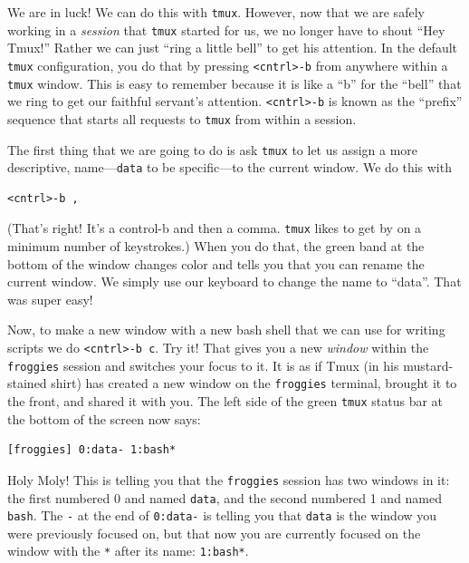 \documentclass[]{krantz}
\begin{document}
We are in luck! We can do this with \texttt{tmux}. However, now that we are safely working in a \emph{session}
that \texttt{tmux} started for us, we no longer have to shout ``Hey Tmux!'' Rather we can just ``ring a little
bell'' to get his attention. In the default \texttt{tmux} configuration, you do that by pressing
\texttt{\textless{}cntrl\textgreater{}-b} from anywhere within a \texttt{tmux} window. This is easy to remember because it is like
a ``b'' for the ``bell'' that we ring to get our faithful servant's attention. \texttt{\textless{}cntrl\textgreater{}-b} is known
as the ``prefix'' sequence that starts all requests to \texttt{tmux} from within a session.

The first thing that we are going to do is ask \texttt{tmux} to let us assign a more descriptive,
name---\texttt{data} to be specific---to the current window. We do this with

\begin{verbatim}
<cntrl>-b ,
\end{verbatim}

(That's right! It's a control-b and then a comma. \texttt{tmux} likes to get by on a minimum number
of keystrokes.) When you do that, the green band at the bottom of the window changes color
and tells you that you can rename the current window. We simply use our keyboard to
change the name to ``data''. That was super easy!

Now, to make a new window with a new bash shell that we can use for writing scripts
we do \texttt{\textless{}cntrl\textgreater{}-b\ c}. Try it! That gives you a new \emph{window} within the \texttt{froggies} session
and switches your focus to it. It is as if Tmux (in his mustard-stained shirt) has created
a new window on the \texttt{froggies} terminal, brought it to the front, and shared it with you.
The left side of the green \texttt{tmux} status bar at the bottom of the screen now says:

\begin{verbatim}
[froggies] 0:data- 1:bash*
\end{verbatim}

Holy Moly! This is telling you that the \texttt{froggies} session has two windows in it: the first
numbered 0 and named \texttt{data}, and the second numbered 1 and named \texttt{bash}. The \texttt{-} at the end
of \texttt{0:data-} is telling you that \texttt{data} is the window you were previously focused on, but that
now you are currently focused on the window with the \texttt{*} after its name: \texttt{1:bash*}.
\end{document}

